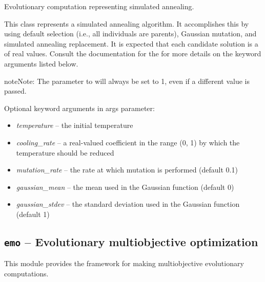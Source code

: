 \documentclass[letterpaper,10pt,english]{sphinxmanual}
\begin{document}
\begin{fulllineitems}
\label{reference:inspyred.ec.SA}
Evolutionary computation representing simulated annealing.

This class represents a simulated annealing algorithm. It accomplishes this
by using default selection (i.e., all individuals are parents), Gaussian
mutation, and simulated annealing replacement. It is expected that each
candidate solution is a  of real values. Consult the
documentation for the  for more
details on the keyword arguments listed below.

\begin{notice}{note}{Note:}
The  parameter to  will always be set to 1, 
even if a different value is passed.
\end{notice}

Optional keyword arguments in  args parameter:
\begin{itemize}
\item {} 
\emph{temperature} -- the initial temperature

\item {} 
\emph{cooling\_rate} -- a real-valued coefficient in the range (0, 1) 
by which the temperature should be reduced

\item {} 
\emph{mutation\_rate} -- the rate at which mutation is performed (default 0.1)

\item {} 
\emph{gaussian\_mean} -- the mean used in the Gaussian function (default 0)

\item {} 
\emph{gaussian\_stdev} -- the standard deviation used in the Gaussian function
(default 1)

\end{itemize}

\end{fulllineitems}

\label{reference:module-inspyred.ec.emo}

\subsection{\texttt{emo} -- Evolutionary multiobjective optimization}
\label{reference:emo-evolutionary-multiobjective-optimization}
This module provides the framework for making multiobjective evolutionary 
computations.
\label{reference:module-emo}
\end{document}
